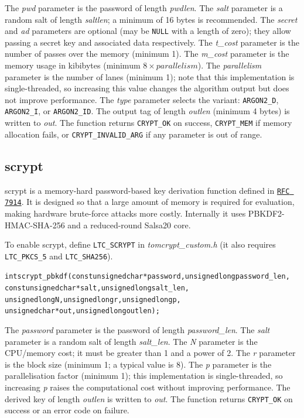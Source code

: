 \documentclass[synpaper]{book}
\begin{document}
The \textit{pwd} parameter is the password of length \textit{pwdlen}.
The \textit{salt} parameter is a random salt of length \textit{saltlen}; a minimum of 16 bytes is recommended.
The \textit{secret} and \textit{ad} parameters are optional (may be \texttt{NULL} with a length of zero); they allow passing a secret key and associated data respectively.
The \textit{t\_cost} parameter is the number of passes over the memory (minimum 1).
The \textit{m\_cost} parameter is the memory usage in kibibytes (minimum $8 \times \textit{parallelism}$).
The \textit{parallelism} parameter is the number of lanes (minimum 1); note that this implementation is single-threaded, so increasing this value changes the algorithm output but does not improve performance.
The \textit{type} parameter selects the variant: \texttt{ARGON2\_D}, \texttt{ARGON2\_I}, or \texttt{ARGON2\_ID}.
The output tag of length \textit{outlen} (minimum 4 bytes) is written to \textit{out}.
The function returns \texttt{CRYPT\_OK} on success, \texttt{CRYPT\_MEM} if memory allocation fails, or \texttt{CRYPT\_INVALID\_ARG} if any parameter is out of range.


\subsection{scrypt}
\label{scrypt}

scrypt is a memory-hard password-based key derivation function defined in \href{https://datatracker.ietf.org/doc/html/rfc7914}{\texttt{RFC 7914}}.
It is designed so that a large amount of memory is required for evaluation, making hardware brute-force attacks more costly.
Internally it uses PBKDF2-HMAC-SHA-256 and a reduced-round Salsa20 core.

To enable scrypt, define \texttt{LTC\_SCRYPT} in \textit{tomcrypt\_custom.h} (it also requires \texttt{LTC\_PKCS\_5} and \texttt{LTC\_SHA256}).

\begin{alltt}
int scrypt_pbkdf(const unsigned char *password, unsigned long password_len,
                 const unsigned char *salt,     unsigned long salt_len,
                 unsigned long N, unsigned long r, unsigned long p,
                 unsigned char *out, unsigned long outlen);
\end{alltt}

The \textit{password} parameter is the password of length \textit{password\_len}.
The \textit{salt} parameter is a random salt of length \textit{salt\_len}.
The \textit{N} parameter is the CPU/memory cost; it must be greater than 1 and a power of 2.
The \textit{r} parameter is the block size (minimum 1; a typical value is 8).
The \textit{p} parameter is the parallelisation factor (minimum 1); this implementation is single-threaded, so increasing \textit{p} raises the computational cost without improving performance.
The derived key of length \textit{outlen} is written to \textit{out}.
The function returns \texttt{CRYPT\_OK} on success or an error code on failure.
\end{document}
